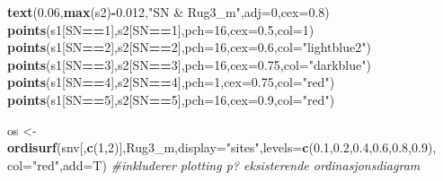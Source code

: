 \documentclass[]{article}
\newenvironment{Shaded}{\begin{snugshade}}{\end{snugshade}}
\newcommand{\CommentTok}[1]{\textcolor[rgb]{0.56,0.35,0.01}{\textit{#1}}}
\newcommand{\DataTypeTok}[1]{\textcolor[rgb]{0.13,0.29,0.53}{#1}}
\newcommand{\DecValTok}[1]{\textcolor[rgb]{0.00,0.00,0.81}{#1}}
\newcommand{\FloatTok}[1]{\textcolor[rgb]{0.00,0.00,0.81}{#1}}
\newcommand{\KeywordTok}[1]{\textcolor[rgb]{0.13,0.29,0.53}{\textbf{#1}}}
\newcommand{\NormalTok}[1]{#1}
\newcommand{\OperatorTok}[1]{\textcolor[rgb]{0.81,0.36,0.00}{\textbf{#1}}}
\newcommand{\StringTok}[1]{\textcolor[rgb]{0.31,0.60,0.02}{#1}}
\begin{document}
\begin{Shaded}
\begin{Highlighting}[]
\KeywordTok{text}\NormalTok{(}\FloatTok{0.06}\NormalTok{,}\KeywordTok{max}\NormalTok{(s2)}\OperatorTok{-}\FloatTok{0.012}\NormalTok{,}\StringTok{"SN & Rug3_m"}\NormalTok{,}\DataTypeTok{adj=}\DecValTok{0}\NormalTok{,}\DataTypeTok{cex=}\FloatTok{0.8}\NormalTok{)}
\KeywordTok{points}\NormalTok{(s1[SN}\OperatorTok{==}\DecValTok{1}\NormalTok{],s2[SN}\OperatorTok{==}\DecValTok{1}\NormalTok{],}\DataTypeTok{pch=}\DecValTok{16}\NormalTok{,}\DataTypeTok{cex=}\FloatTok{0.5}\NormalTok{,}\DataTypeTok{col=}\DecValTok{1}\NormalTok{)}
\KeywordTok{points}\NormalTok{(s1[SN}\OperatorTok{==}\DecValTok{2}\NormalTok{],s2[SN}\OperatorTok{==}\DecValTok{2}\NormalTok{],}\DataTypeTok{pch=}\DecValTok{16}\NormalTok{,}\DataTypeTok{cex=}\FloatTok{0.6}\NormalTok{,}\DataTypeTok{col=}\StringTok{"lightblue2"}\NormalTok{)}
\KeywordTok{points}\NormalTok{(s1[SN}\OperatorTok{==}\DecValTok{3}\NormalTok{],s2[SN}\OperatorTok{==}\DecValTok{3}\NormalTok{],}\DataTypeTok{pch=}\DecValTok{16}\NormalTok{,}\DataTypeTok{cex=}\FloatTok{0.75}\NormalTok{,}\DataTypeTok{col=}\StringTok{"darkblue"}\NormalTok{)}
\KeywordTok{points}\NormalTok{(s1[SN}\OperatorTok{==}\DecValTok{4}\NormalTok{],s2[SN}\OperatorTok{==}\DecValTok{4}\NormalTok{],}\DataTypeTok{pch=}\DecValTok{1}\NormalTok{,}\DataTypeTok{cex=}\FloatTok{0.75}\NormalTok{,}\DataTypeTok{col=}\StringTok{"red"}\NormalTok{)}
\KeywordTok{points}\NormalTok{(s1[SN}\OperatorTok{==}\DecValTok{5}\NormalTok{],s2[SN}\OperatorTok{==}\DecValTok{5}\NormalTok{],}\DataTypeTok{pch=}\DecValTok{16}\NormalTok{,}\DataTypeTok{cex=}\FloatTok{0.9}\NormalTok{,}\DataTypeTok{col=}\StringTok{"red"}\NormalTok{)}

\NormalTok{os <-}\StringTok{ }\KeywordTok{ordisurf}\NormalTok{(snv[,}\KeywordTok{c}\NormalTok{(}\DecValTok{1}\NormalTok{,}\DecValTok{2}\NormalTok{)],Rug3_m,}\DataTypeTok{display=}\StringTok{"sites"}\NormalTok{,}\DataTypeTok{levels=}\KeywordTok{c}\NormalTok{(}\FloatTok{0.1}\NormalTok{,}\FloatTok{0.2}\NormalTok{,}\FloatTok{0.4}\NormalTok{,}\FloatTok{0.6}\NormalTok{,}\FloatTok{0.8}\NormalTok{,}\FloatTok{0.9}\NormalTok{), }\DataTypeTok{col=}\StringTok{"red"}\NormalTok{,}\DataTypeTok{add=}\NormalTok{T) }\CommentTok{#inkluderer plotting p? eksisterende ordinasjonsdiagram}
\end{Highlighting}
\end{Shaded}
\end{document}
